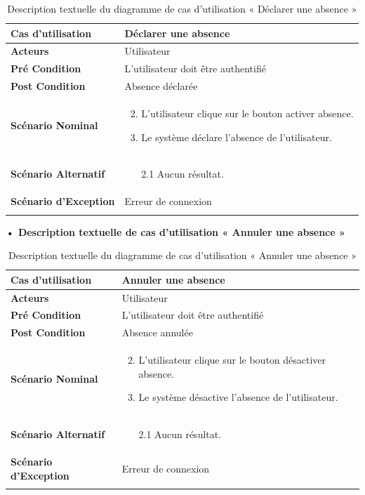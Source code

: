 \begin{longtable}{|p{5cm}|p{10cm}|}
\hline
\textbf{Cas d'utilisation}&Déclarer une absence    \\
\hline
\textbf{Acteurs}&Utilisateur\\
\hline
\textbf{Pré Condition}&L'utilisateur doit être authentifié\\
\hline
\textbf{Post Condition}&Absence déclarée \\
\hline
\textbf{Scénario Nominal}&
\vspace{-\baselineskip}
\begin{enumerate}
  \setcounter{enumi}{1}
  \item L'utilisateur clique sur le bouton activer absence.
  \item Le système déclare l'absence de l'utilisateur.
  
\end{enumerate}\\
\hline
\textbf{Scénario Alternatif}&
\vspace{-\baselineskip}
\begin{enumerate}
 \item [2.1] Aucun résultat.
\end{enumerate}\\
\hline
\textbf{Scénario d'Exception}&
Erreur de connexion\\
\hline
\caption{Description textuelle du diagramme de cas d'utilisation « Déclarer une absence    »}
\label{tab:use_case_declare_absence}
\end{longtable}

\textbf{•	Description textuelle de cas d'utilisation « Annuler une absence    »}

\begin{longtable}{|p{5cm}|p{10cm}|}
\hline
\textbf{Cas d'utilisation}&Annuler une absence     \\
\hline
\textbf{Acteurs}&Utilisateur\\
\hline
\textbf{Pré Condition}&L'utilisateur doit être authentifié\\
\hline
\textbf{Post Condition}&Absence annulée \\
\hline
\textbf{Scénario Nominal}&
\vspace{-\baselineskip}
\begin{enumerate}
  \setcounter{enumi}{1}
  \item L'utilisateur clique sur le bouton désactiver absence.
  \item Le système désactive l'absence de l'utilisateur.
\end{enumerate}\\
\hline
\textbf{Scénario Alternatif}&
\vspace{-\baselineskip}
\begin{enumerate}
 \item [2.1] Aucun résultat.
\end{enumerate}\\
\hline
\textbf{Scénario d'Exception}&
Erreur de connexion\\
\hline
\caption{Description textuelle du diagramme de cas d'utilisation « Annuler une absence     »}
\label{tab:use_case_cancel_absence}
\end{longtable}


